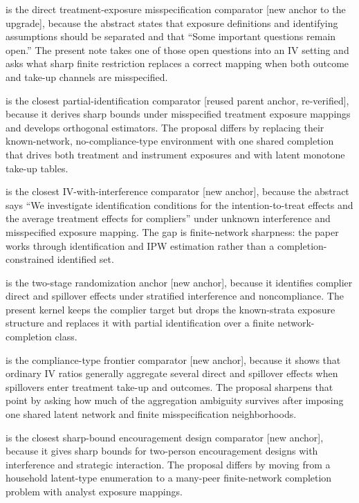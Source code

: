\documentclass[11pt]{article}
\theoremstyle{definition}
\theoremstyle{plain}
\theoremstyle{remark}
\begin{document}
\citet{savje_2024_misspecified_exposure_mappings} is the direct treatment-exposure misspecification comparator [new anchor to the upgrade], because the abstract states that exposure definitions and identifying assumptions should be separated and that ``Some important questions remain open.'' The present note takes one of those open questions into an IV setting and asks what sharp finite restriction replaces a correct mapping when both outcome and take-up channels are misspecified.

\citet{schroder_oprescu_feuerriegel_kallus_2026_networks_partialid} is the closest partial-identification comparator [reused parent anchor, re-verified], because it derives sharp bounds under misspecified treatment exposure mappings and develops orthogonal estimators. The proposal differs by replacing their known-network, no-compliance-type environment with one shared completion that drives both treatment and instrument exposures and with latent monotone take-up tables.

\citet{hoshino_yanagi_2024_noncompliance_unknown_interference} is the closest IV-with-interference comparator [new anchor], because the abstract says ``We investigate identification conditions for the intention-to-treat effects and the average treatment effects for compliers'' under unknown interference and misspecified exposure mapping. The gap is finite-network sharpness: the paper works through identification and IPW estimation rather than a completion-constrained identified set.

\citet{imai_jiang_malani_2021_interference_noncompliance} is the two-stage randomization anchor [new anchor], because it identifies complier direct and spillover effects under stratified interference and noncompliance. The present kernel keeps the complier target but drops the known-strata exposure structure and replaces it with partial identification over a finite network-completion class.

\citet{vazquez_bare_2023_iv_spillovers} is the compliance-type frontier comparator [new anchor], because it shows that ordinary IV ratios generally aggregate several direct and spillover effects when spillovers enter treatment take-up and outcomes. The proposal sharpens that point by asking how much of the aggregation ambiguity survives after imposing one shared latent network and finite misspecification neighborhoods.

\citet{acerenza_martinez_iriarte_sanchez_becerra_spini_2025_household_bounds} is the closest sharp-bound encouragement design comparator [new anchor], because it gives sharp bounds for two-person encouragement designs with interference and strategic interaction. The proposal differs by moving from a household latent-type enumeration to a many-peer finite-network completion problem with analyst exposure mappings.
\end{document}
